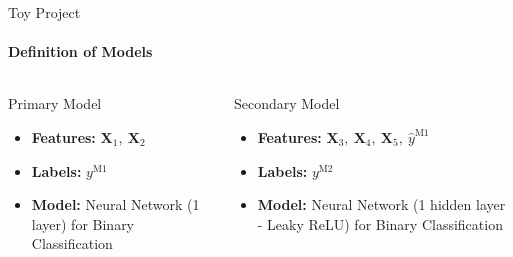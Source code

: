 \documentclass{beamer} %
\begin{document}
\begin{frame}{Toy Project}
  \framesubtitle{Definition of Models}
  
  \begin{columns}
    \begin{column}{.45\textwidth}
        \begin{block}{Primary Model}
        		\begin{itemize}
        			\item \textbf{Features:} $\textbf{X}_1,\ \textbf{X}_2$
        			\item \textbf{Labels:} $y^{\text{M1}}$
        			\item \textbf{Model:} Neural Network (1 layer) for 
        			Binary Classification
        		\end{itemize}
        \end{block}
    \end{column}

    \begin{column}{.45\textwidth}
        \begin{block}{Secondary Model}
			\begin{itemize}
        			\item \textbf{Features:} $\textbf{X}_3,\ \textbf{X}_4,
        			\ \textbf{X}_5,\ \hat{y}^{\text{M1}}$
        			
        			\item \textbf{Labels:} $y^{\text{M2}}$
        			
					\vspace{.1cm}        			
					
        			\item \textbf{Model:} Neural Network (1 hidden layer - 
        			Leaky ReLU) for Binary Classification
        			
        		\end{itemize}
        \end{block}
    \end{column}
    
  \end{columns}
	
\end{frame}
\end{document}
